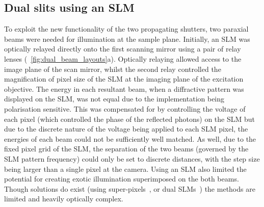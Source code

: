 \subsection{Dual slits using an \gls{SLM}}\label{sec:dualslits}

To exploit the new functionality of the two propagating shutters, two paraxial beams were needed for illumination at the sample plane.
Initially, an \gls{SLM} was optically relayed directly onto the first scanning mirror using a pair of relay lenses (\figurename~\ref{fig:dual_beam_layouts}a).
Optically relaying allowed access to the image plane of the scan mirror, whilst the second relay controlled the magnification of pixel size of the \gls{SLM} at the imaging plane of the excitation objective.
The energy in each resultant beam, when a diffractive pattern was displayed on the \gls{SLM}, was not equal due to the implementation being polarisation sensitive.
This was compensated for by controlling the voltage of each pixel (which controlled the phase of the reflected photons) on the \gls{SLM} but due to the discrete nature of the voltage being applied to each \gls{SLM} pixel, the energies of each beam could not be sufficiently well matched.
As well, due to the fixed pixel grid of the \gls{SLM}, the separation of the two beams (governed by the \gls{SLM} pattern frequency) could only be set to discrete distances, with the step size being larger than a single pixel at the camera.
Using an \gls{SLM} also limited the potential for creating exotic illumination superimposed on the both beams.
Though solutions do exist (using super-pixels~\cite{puttenSpatialAmplitudePhase2008}, or dual SLMs~\cite{fuImagingMulticellularSpecimens2016}) the methods are limited and heavily optically complex.
